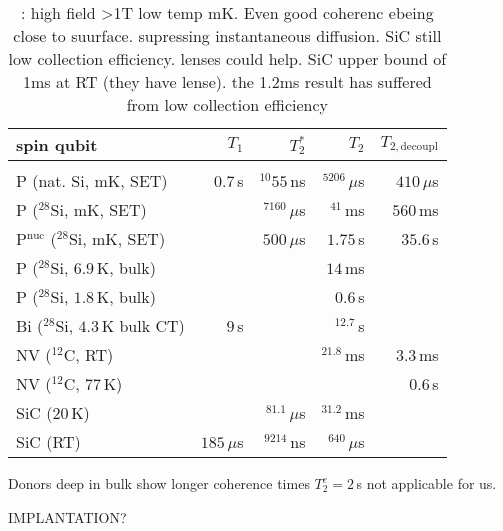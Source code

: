 \begin{table}[H]
\begin{tabular}{lrrrr}
	\hline
	spin qubit & $T_1$ & $T_2^{*}$ & $T_2$ & $T_{2,\textrm{decoupl}}$ \\ \hline \\
P (nat. Si, mK, SET) \cite{Pla2012}& $0.7\, $s & $^{10}55\, $ns  & $^5206\, \mu$s & $410\, \mu$s  \\
P ($^{28}$Si, mK, SET) \cite{Muhonen2014}&  & $^7160\, \mu$s  & $^41\, $ms & $560\, $ms \\
P$^{\text{nuc}}$ ($^{28}$Si, mK, SET) \cite{Muhonen2014}& & $500\, \mu$s & $1.75\, $s & $35.6\, $s \\
P ($^{28}$Si, $6.9\, $K, bulk) \cite{Morley2010}& &  & $14\, $ms &  \\
P ($^{28}$Si, $1.8\, $K, bulk) \cite{Tyryshkin2011}& &  & $0.6\, $s &  \\
Bi ($^{28}$Si, $4.3\, $K bulk CT) \cite{Wolfowicz2013} & $9\, $s &  & $^12.7\, $s &\\
NV ($^{12}$C, RT) \cite{Balasubramanian2009,Bar-Gill2013} & & & $^21.8\, $ms & $3.3\, $ms \\
NV ($^{12}$C, $77\, $K) \cite{Bar-Gill2013} & & &  & $0.6\, $s \\
SiC ($20\, $K) \cite{Christle2014} & & $^81.1\, \mu$s & $^31.2\, $ms &  \\
SiC (RT) \cite{Koehl2011} & $185\, \mu$s & $^9214\, $ns & $^640\, \mu$s &   \\
\hline
\end{tabular} 
\caption{\cite{Pla2012,Muhonen2014}: high field >1T low temp mK. Even good coherenc ebeing close to suurface. \cite{Tyryshkin2011} supressing instantaneous diffusion. SiC still low collection efficiency. lenses could help. SiC upper bound of 1ms at RT \cite{Widmann2014} (they have lense). the 1.2ms result has suffered from low collection efficiency}
\label{TAB:qubits}
\end{table}

Donors deep in bulk show longer coherence times $T_2^e=2\, $s \cite{Tyryshkin2011} not applicable for us.

IMPLANTATION?